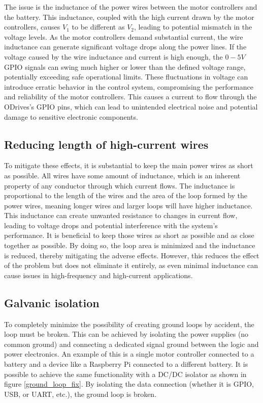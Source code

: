     The issue is the inductance of the power wires between the motor controllers and the battery. This inductance, coupled with the high current drawn by the motor controllers, causes $V_1$ to be different as $V_2$, leading to potential mismatch in the voltage levels. As the motor controllers demand substantial current, the wire inductance can generate significant voltage drops along the power lines. If the voltage caused by the wire inductance and current is high enough, the $0-5V$ GPIO signals can swing much higher or lower than the defined voltage range, potentially exceeding safe operational limits. These fluctuations in voltage can introduce erratic behavior in the control system, compromising the performance and reliability of the motor controllers. This causes a current to flow through the ODrives's GPIO pins, which can lead to unintended electrical noise and potential damage to sensitive electronic components.

    \clearpage %
    
    \subsection{Reducing length of high-current wires}
    
    To mitigate these effects, it is substantial to keep the main power wires as short as possible. All wires have some amount of inductance, which is an inherent property of any conductor through which current flows. The inductance is proportional to the length of the wires and the area of the loop formed by the power wires, meaning longer wires and larger loops will have higher inductance. This inductance can create unwanted resistance to changes in current flow, leading to voltage drops and potential interference with the system's performance. It is beneficial to keep those wires as short as possible and as close together as possible. By doing so, the loop area is minimized and the inductance is reduced, thereby mitigating the adverse effects. However, this reduces the effect of the problem but does not eliminate it entirely, as even minimal inductance can cause issues in high-frequency and high-current applications.
    
    \subsection{Galvanic isolation}
    
    To completely minimize the possibility of creating ground loops by accident, the loop must be broken. This can be achieved by isolating the power supplies (no common ground) and connecting a dedicated signal ground between the logic and power electronics. An example of this is a single motor controller connected to a battery and a device like a Raspberry Pi connected to a different battery. It is possible to achieve the same functionality with a DC/DC isolator as shown in figure \ref{ground_loop_fix}. By isolating the data connection (whether it is GPIO, USB, or UART, etc.), the ground loop is broken.
    
